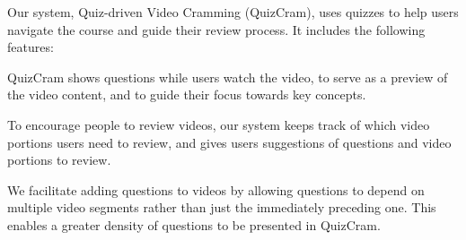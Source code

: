 \documentclass{sigchi}
\begin{document}

Our system, Quiz-driven Video Cramming (QuizCram), uses quizzes to help users navigate the course and guide their review process. It includes the following features:

\begin{compactitem}
\item QuizCram shows questions while users watch the video, to serve as a preview of the video content, and to guide their focus towards key concepts.
\item To encourage people to review videos, our system keeps track of which video portions users need to review, and gives users suggestions of questions and video portions to review. %
\item We facilitate adding questions to videos by allowing questions to depend on multiple video segments rather than just the immediately preceding one. This enables a greater density of questions to be presented in QuizCram.
\end{compactitem}
\end{document}
